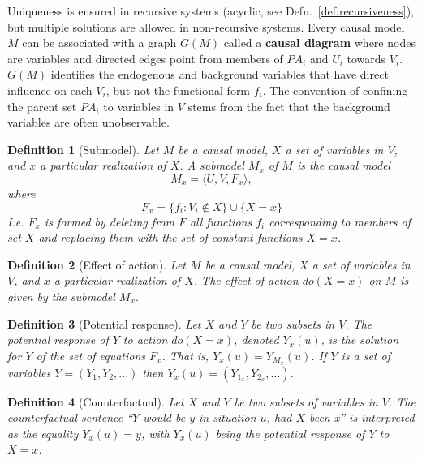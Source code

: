 \documentclass[11pt]{article}
\numberwithin{equation}{section}
\newtheorem{defn}{Definition}[section]
\begin{document}
Uniqueness is ensured in recursive systems (acyclic, see Defn.~\ref{def:recursiveness}), but multiple solutions are allowed in non-recursive systems. Every causal model $M$ can be associated with a graph $G(M)$ called a \textbf{causal diagram} where nodes are variables and directed edges point from members of $PA_i$ and $U_i$ towards $V_i$. $G(M)$ identifies the endogenous and background variables that have direct influence on each $V_i$, but not the functional form $f_i$. The convention of confining the parent set $PA_i$ to variables in $V$ stems from the fact that the background variables are often unobservable.

\begin{defn}[Submodel]
Let $M$ be a causal model, $X$ a set of variables in $V$, and $x$ a particular realization of $X$. A submodel $M_x$ of $M$ is the causal model
\begin{equation}
M_x = \langle U, V, F_x \rangle, \nonumber
\end{equation}
where
\begin{equation}
F_x = \{f_i : V_i \notin X \} \cup \{X=x \}
\end{equation}
I.e. $F_x$ is formed by deleting from $F$ all functions $f_i$ corresponding to members of set $X$ and replacing them with the set of constant functions $X=x$.
\end{defn}

\begin{defn}[Effect of action]
Let $M$ be a causal model, $X$ a set of variables in $V$, and $x$ a particular realization of $X$. The effect of action $do(X=x)$ on $M$ is given by the submodel $M_x$.
\end{defn}

\begin{defn}[Potential response]
Let $X$ and $Y$ be two subsets in $V$. The potential response of $Y$ to action $do(X=x)$, denoted $Y_x(u)$, is the solution for $Y$ of the set of equations $F_x$. That is, $Y_x(u) = Y_{M_x}(u)$. If $Y$ is a set of variables $Y=(Y_1,Y_2,...)$ then $Y_x(u) = (Y_{1_x},Y_{2_x},...)$.
\end{defn}

\begin{defn}[Counterfactual]
Let $X$ and $Y$ be two subsets of variables in $V$. The counterfactual sentence ``$Y$ would be $y$ in situation $u$, had $X$ been x'' is interpreted as the equality $Y_x(u)=y$, with $Y_x(u)$ being the potential response of $Y$ to $X=x$.
\end{defn}
\end{document}
